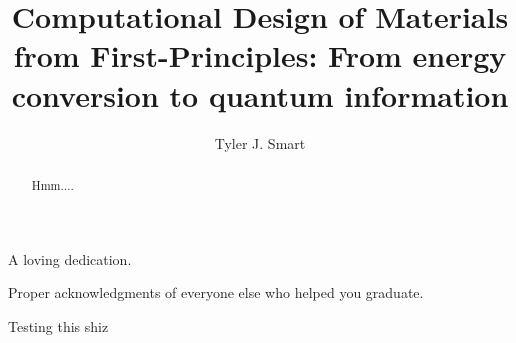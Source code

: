 \documentclass[12pt]{include/ucthesis}
\begin{document}
\title{Computational Design of Materials from First-Principles: From energy conversion to quantum information}
\author{Tyler J. Smart}
\deanlinethree{}

\begin{frontmatter}
\maketitle

\copyrightpage

\tableofcontents

\listoffigures

\listoftables

\begin{abstract}
    Hmm....
\end{abstract}

\begin{dedication}
\vspace*{\fill}
\begin{center}
A loving dedication.
\end{center}
\vspace*{\fill}
\end{dedication}

\begin{acknowledgements}
Proper acknowledgments of everyone else who helped you graduate.
\end{acknowledgements}

\end{frontmatter}







\appendix




Testing this shiz\cite{xsede}


\nocite{*}

\singlespacing

\doublespacing
\end{document}
